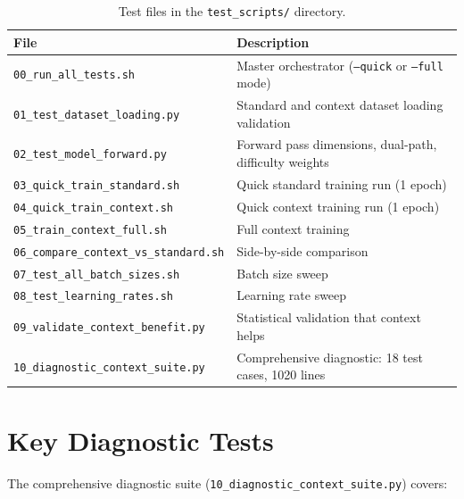\documentclass[11pt, a4paper]{report}
\begin{document}
\begin{table}[h]
\centering
\caption{Test files in the \texttt{test\_scripts/} directory.}
\label{tab:test-files}
\small
\begin{tabularx}{\textwidth}{lX}
\toprule
\textbf{File} & \textbf{Description} \\
\midrule
\texttt{00\_run\_all\_tests.sh} & Master orchestrator (\texttt{--quick} or \texttt{--full} mode) \\
\texttt{01\_test\_dataset\_loading.py} & Standard and context dataset loading validation \\
\texttt{02\_test\_model\_forward.py} & Forward pass dimensions, dual-path, difficulty weights \\
\texttt{03\_quick\_train\_standard.sh} & Quick standard training run (1 epoch) \\
\texttt{04\_quick\_train\_context.sh} & Quick context training run (1 epoch) \\
\texttt{05\_train\_context\_full.sh} & Full context training \\
\texttt{06\_compare\_context\_vs\_standard.sh} & Side-by-side comparison \\
\texttt{07\_test\_all\_batch\_sizes.sh} & Batch size sweep \\
\texttt{08\_test\_learning\_rates.sh} & Learning rate sweep \\
\texttt{09\_validate\_context\_benefit.py} & Statistical validation that context helps \\
\texttt{10\_diagnostic\_context\_suite.py} & Comprehensive diagnostic: 18 test cases, 1020 lines \\
\bottomrule
\end{tabularx}
\end{table}

\section{Key Diagnostic Tests}
\label{sec:diagnostic-tests}

The comprehensive diagnostic suite (\texttt{10\_diagnostic\_context\_suite.py}) covers:
\end{document}
